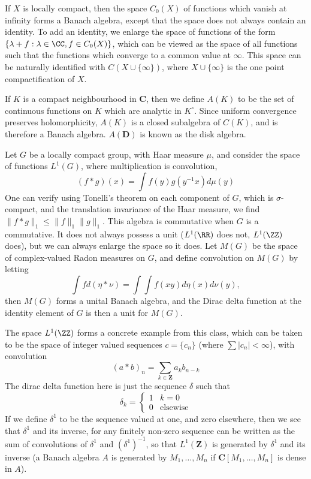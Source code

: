 \begin{example}
    If $X$ is locally compact, then the space $C_0(X)$ of functions which vanish at infinity forms a Banach algebra, except that the space does not always contain an identity. To add an identity, we enlarge the space of functions of the form $\{ \lambda + f : \lambda \in \CC, f \in C_0(X) \}$, which can be viewed as the space of all functions such that the functions which converge to a common value at $\infty$. This space can be naturally identified with $C(X \cup \{ \infty \})$, where $X \cup \{ \infty \}$ is the one point compactification of $X$.
\end{example}

\begin{example}
    If $K$ is a compact neighbourhood in $\mathbf{C}$, then we define $A(K)$ to be the set of continuous functions on $K$ which are analytic in $K^\circ$. Since uniform convergence preserves holomorphicity, $A(K)$ is a closed subalgebra of $C(K)$, and is therefore a Banach algebra. $A(\mathbf{D})$ is known as the disk algebra.
\end{example}

\begin{example}
    Let $G$ be a locally compact group, with Haar measure $\mu$, and consider the space of functions $L^1(G)$, where multiplication is convolution,
    \[ (f * g)(x) = \int f(y) g(y^{-1}x) d\mu(y) \]
    One can verify using Tonelli's theorem on each component of $G$, which is $\sigma$-compact, and the translation invariance of the Haar measure, we find $\| f * g \|_1 \leq \| f \|_1 \| g \|_1$. This algebra is commutative when $G$ is a commutative. It does not always possess a unit ($L^1(\RR)$ does not, $L^1(\ZZ)$ does), but we can always enlarge the space so it does. Let $M(G)$ be the space of complex-valued Radon measures on $G$, and define convolution on $M(G)$ by letting
    \[ \int f d (\eta * \nu) = \int \int f(xy) d\eta(x) d\nu(y), \]
    then $M(G)$ forms a unital Banach algebra, and the Dirac delta function at the identity element of $G$ is then a unit for $M(G)$.

    The space $L^1(\ZZ)$ forms a concrete example from this class, which can be taken to be the space of integer valued sequences $c = \{ c_n \}$ (where $\sum |c_n| < \infty$), with convolution
    \[ (a * b)_n = \sum_{k \in \mathbf{Z}} a_k b_{n-k} \]
    The dirac delta function here is just the sequence $\delta$ such that
    \[ \delta_k = \begin{cases} 1 & k = 0 \\ 0 & \text{elsewise} \end{cases} \]
    If we define $\delta^1$ to be the sequence valued at one, and zero elsewhere, then we see that $\delta^1$ and its inverse, for any finitely non-zero sequence can be written as the sum of convolutions of $\delta^1$ and $(\delta^1)^{-1}$, so that $L^1(\mathbf{Z})$ is generated by $\delta^1$ and its inverse (a Banach algebra $A$ is generated by $M_1, \dots, M_n$ if $\mathbf{C}[M_1, \dots, M_n]$ is dense in $A$).
\end{example}

